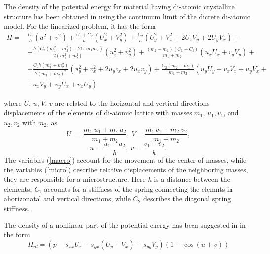 The density of the potential energy for material having di-atomic crystalline structure  has been obtained in \cite{porsp17} using the continuum limit of the dicrete di-atomic model. For the linearized problem, it has the form
\begin{equation}
	\begin{aligned}
		\Pi = & \frac{C_1}{h} \left(u^2 + v^2\right) + \frac{C_1+C_2}{h}\left(U_x^2+V_y^2\right) +\frac{C_2}{h}\left(U_y^2 + V_x^2 + 2U_x V_y + 2 U_y V_x\right) + \\ 
		& + \frac{h\left(C_2\left(m_1^2 + m_2^2\right) - 2C_1 m_1 m_2\right)}{2\left(m_1^2 + m_2^2\right)}\left(u_x^2 + v_y^2\right) + \frac{\left(m_2-m_1\right)\left(C_1+C_2\right)}{m_1+m_2}\left(u_x U_x + v_y V_y\right) + \\ 
		& + \frac{C_2 h\left(m_1^2+m_2^2\right)}{2\left(m_1+m_2\right)^2}\left(u_y^2+v_x^2+2u_y v_x + 2u_x v_y\right) + \frac{C_2\left(m_2 - m_1\right)}{m_1 + m_2}\left(u_y U_y+v_x V_x + u_y V_x + \right. \\
		& + \left. u_x V_y + v_y U_x + v_x U_y\right)
	\end{aligned}
\end{equation}

where $U$,  $u$, $V$, $v$ are related to the horizontal and vertical directions displacements of the elements of di-atomic lattice with masses $m_1$, $u_1, v_1$, and $u_2, v_2$ with $m_2$, as
\begin{equation}
	U~=~\frac{m_1~u_1+m_2~u_2}{m_1+m_2},~V=\frac{m_1~v_1+m_2~v_2}{m_1+m_2}, \label{macro}
\end{equation}
\begin{equation}
	u=\frac{u_1-u_2}{h},~v=\frac{v_1-v_2}{h}. \label{micro}
\end{equation}
The variables (\ref{macro}) account for the movement of the center of masses, while the variables (\ref{micro}) describe relative displacements of the neighboring masses, they are responsible for a microstructure.
Here  $h$ is a distance between the elements, $C_1$ accounts for a stiffness of the spring connecting the elemnts in ahorizonatal and vertical directions, while $C_2$ describes the diagonal spring stiffness.

The density of a nonlinear part of the potential energy has been suggested in \cite{aeroplane, porsp17} in the form
\begin{equation}
	\Pi_{nl} = \left( p - s_{xx} U_x - s_{yx} \left( U_y + V_x\right) - s_{yy} V_y\right) \left( 1- \cos{(u+v)}\right) \label{pot}
\end{equation}

